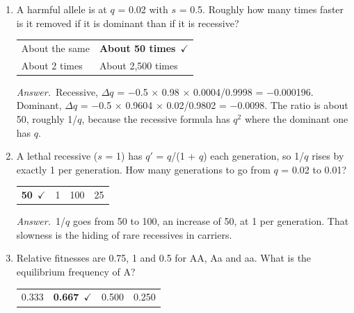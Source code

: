 \documentclass[11pt]{article}
\newcommand{\keyans}[1]{\par\medskip\noindent\textit{Answer.}\ #1\par\medskip}
\begin{document}
\begin{enumerate}[label=\textbf{\arabic*.}, leftmargin=2em, itemsep=1.4em]
\item A harmful allele is at \(q\) = 0.02 with \(s\) = 0.5. Roughly how many times faster is it removed if it is dominant than if it is recessive?
\nopagebreak\par{}
\par\smallskip\noindent\begin{tabularx}{\linewidth}{@{}YY@{}}
About the same & \textbf{About 50 times}\ \(\checkmark\) \\[3pt]
About 2 times & About 2{,}500 times \\
\end{tabularx}
\keyans{Recessive, \(\Delta q\) = \(-\)0.5 \(\times\) 0.98 \(\times\) 0.0004/0.9998 = \(-\)0.000196. Dominant, \(\Delta q\) = \(-\)0.5 \(\times\) 0.9604 \(\times\) 0.02/0.9802 = \(-\)0.0098. The ratio is about 50, roughly 1/\(q\), because the recessive formula has \(q^2\) where the dominant one has \(q\).}
\item A lethal recessive (\(s\) = 1) has \(q'\) = \(q\)/(1 + \(q\)) each generation, so 1/\(q\) rises by exactly 1 per generation. How many generations to go from \(q\) = 0.02 to 0.01?
\nopagebreak\par{}
\par\smallskip\noindent\begin{tabularx}{\linewidth}{@{}YYYY@{}}
\textbf{50}\ \(\checkmark\) & 1 & 100 & 25 \\
\end{tabularx}
\keyans{1/\(q\) goes from 50 to 100, an increase of 50, at 1 per generation. That slowness is the hiding of rare recessives in carriers.}
\item Relative fitnesses are 0.75, 1 and 0.5 for AA, Aa and aa. What is the equilibrium frequency of A?
\nopagebreak\par{}
\par\smallskip\noindent\begin{tabularx}{\linewidth}{@{}YYYY@{}}
0.333 & \textbf{0.667}\ \(\checkmark\) & 0.500 & 0.250 \\

\end{tabularx}
\end{enumerate}
\end{document}
